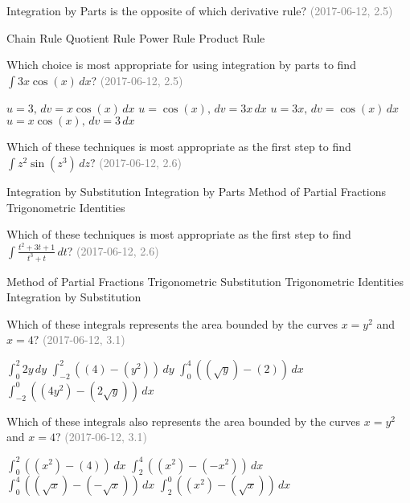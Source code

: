 \documentclass[12pt]{exam}
\newcommand{\questionDate}[1]{\textcolor{gray}{(#1)}}
\newcommand{\<}{\langle}
\renewcommand{\>}{\rangle}
\begin{document}
\begin{questions}
  \question
  Integration by Parts is the opposite of which derivative rule?
  \questionDate{2017-06-12, 2.5}
  \begin{choices}
    \choice Chain Rule
    \choice Quotient Rule
    \choice Power Rule
    \CorrectChoice Product Rule
  \end{choices}

  \question
  Which choice is most appropriate for using integration by parts
  to find \(\int 3x\cos(x)\,dx\)?
  \questionDate{2017-06-12, 2.5}
  \begin{choices}
    \choice \(u=3,\,dv=x\cos(x)\,dx\)
    \choice \(u=\cos(x),\,dv=3x\,dx\)
    \CorrectChoice \(u=3x,\,dv=\cos(x)\,dx\)
    \choice \(u=x\cos(x),\,dv=3\,dx\)
  \end{choices}

  \question
  Which of these techniques is most appropriate as the first step to find
  \(\int z^2\sin(z^3)\,dz\)?
  \questionDate{2017-06-12, 2.6}
  \begin{choices}
    \CorrectChoice
      Integration by Substitution
    \choice
      Integration by Parts
    \choice
      Method of Partial Fractions
    \choice
      Trigonometric Identities
  \end{choices}


  \newpage

  \question
  Which of these techniques is most appropriate as the first step to find
  \(\int \frac{t^2+3t+1}{t^3+t}\,dt\)?
  \questionDate{2017-06-12, 2.6}
  \begin{choices}
    \CorrectChoice
      Method of Partial Fractions
    \choice
      Trigonometric Substitution
    \choice
      Trigonometric Identities
    \choice
      Integration by Substitution
  \end{choices}


  \question
  Which of these integrals
  represents the area bounded by the curves \(x=y^2\) and \(x=4\)?
  \questionDate{2017-06-12, 3.1}
  \begin{choices}
    \choice
      \(\int_0^2 2y\,dy\)
    \CorrectChoice
      \(\int_{-2}^2((4)-(y^2))\,dy\)
    \choice
      \(\int_0^4((\sqrt y)-(2))\,dx\)
    \choice
      \(\int_{-2}^0((4y^2)-(2\sqrt y))\,dx\)
  \end{choices}

  \question
  Which of these integrals also
  represents the area bounded by the curves \(x=y^2\) and \(x=4\)?
  \questionDate{2017-06-12, 3.1}
  \begin{choices}
    \choice
      \(\int_0^2((x^2)-(4))\,dx\)
    \choice
      \(\int_2^4((x^2)-(-x^2))\,dx\)
    \CorrectChoice
      \(\int_0^4((\sqrt x)-(-\sqrt x))\,dx\)
    \choice
      \(\int_2^0((x^2)-(\sqrt x))\,dx\)
  \end{choices}








\end{questions}
\end{document}
